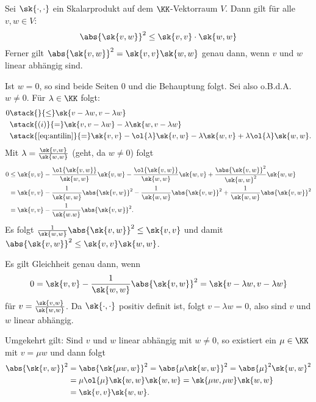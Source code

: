 \begin{satz}
	\label{satz:3.4}
	Sei $\sk{\cdot,\cdot}$ ein Skalarprodukt auf dem $\KK$-Vektorraum $V$.
	Dann gilt für alle $v,w \in V$: 
	\[
		\abs{\sk{v,w}}^2 \leq \sk{v,v} \cdot \sk{w,w}
	\]
	Ferner gilt $\abs{\sk{v,w}}^2 = \sk{v,v} \sk{w,w}$ genau dann, wenn $v$ und $w$ linear abhängig sind.
\end{satz}

\begin{beweis}
	Ist $w = 0$, so sind beide Seiten $0$ und die Behauptung folgt.
	Sei also o.B.d.A. $w \neq 0$.
	Für $\lambda \in \KK$ folgt:
	\begin{align*}
		0 &\stack{}{\leq} \sk{v-\lambda w, v - \lambda w} \\
		&\stack{(i)}{=} \sk{v,v-\lambda w} - \lambda \sk{w,v-\lambda w} \\
		&\stack{\eqref{eq:antilin}}{=} \sk{v,v} - \ol{\lambda} \sk{v,w} - \lambda \sk{w,v} + \lambda \ol{\lambda} \sk{w,w}.
	\end{align*}
	Mit $\lambda = \frac{\sk{v,w}}{\sk{w,w}}$ (geht, da $w \neq 0$) folgt
	\begin{align*}
		0 &\leq \sk{v,v} - \frac{\ol{\sk{v,w}}}{\sk{w,w}} \sk{v,w} - \frac{\ol{\sk{v,w}}}{\sk{w,w}} \sk{w,v} + \frac{\abs{\sk{v,w}}^2}{\sk{w,w}^2} \sk{w,w} \\
		&= \sk{v,v} - \frac{1}{\sk{w,w}} \abs{\sk{v,w}}^2 - \frac{1}{\sk{w,w}} \abs{\sk{v,w}}^2 + \frac{1}{\sk{w,w}} \abs{\sk{v,w}}^2 \\
		&= \sk{v,v} - \frac{1}{\sk{w.w}} \abs{\sk{v,w}}^2.
	\end{align*}
	Es folgt $\frac{1}{\sk{w,w}} \abs{\sk{v,w}}^2 \leq \sk{v,v}$ und damit $\abs{\sk{v,w}}^2 \leq \sk{v,v} \sk{w,w}$.
	
	Es gilt Gleichheit genau dann, wenn
	\[
		0 = \sk{v,v} - \frac{1}{\sk{w,w}} \abs{\sk{v,w}}^2 = \sk{v- \lambda w, v-\lambda w}
	\]
	für $v = \frac{\sk{v,w}}{\sk{w,w}}$.
	Da $\sk{\cdot,\cdot}$ positiv definit ist, folgt $v - \lambda w = 0$, also sind $v$ und $w$ linear abhängig.
	
	Umgekehrt gilt:
	Sind $v$ und $w$ linear abhängig mit $w \neq 0$, so existiert ein $\mu \in \KK$ mit $v = \mu w$ und dann folgt
	\begin{align*}
		\abs{\sk{v,w}}^2 &= \abs{\sk{\mu w,w}}^2 = \abs{\mu \sk{w,w}}^2 = \abs{\mu}^2 \sk{w,w}^2 \\
		&= \mu \ol{\mu} \sk{w,w} \sk{w,w} = \sk{\mu w, \mu w} \sk{w,w} \\
		&= \sk{v,v} \sk{w,w}. 
	\end{align*}
\end{beweis}

